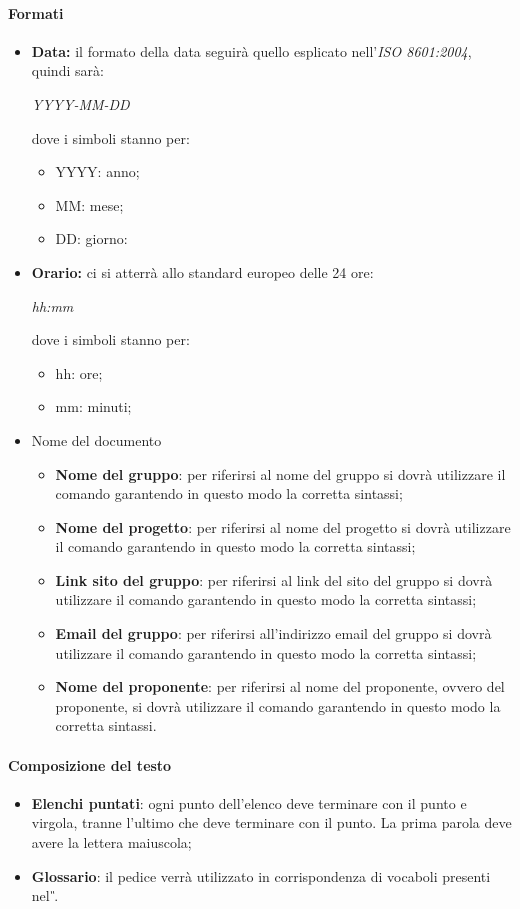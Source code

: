 \paragraph{Formati}
\begin{itemize}
	\item \textbf{Data:} il formato della data seguirà quello esplicato nell'\emph{ISO 8601:2004}, quindi sarà: 
	\begin{center}
		\emph{YYYY-MM-DD}
	\end{center}
	dove i simboli stanno per:
	\begin{itemize}
		\item YYYY: anno;
		\item MM: mese;
		\item DD: giorno:
	\end{itemize}
	\item \textbf{Orario:} ci si atterrà allo standard europeo delle 24 ore:
	 \begin{center}
	 	\emph{hh:mm}
	 \end{center}
 	dove i simboli stanno per:
 	\begin{itemize}
 		\item hh: ore;
 		\item mm: minuti;
 	\end{itemize}
	\item{Nome del documento}
	\begin{itemize}
	\item \textbf{Nome del gruppo}: per riferirsi al nome del gruppo si dovrà
	utilizzare il comando garantendo in questo modo la corretta sintassi;
	\item \textbf{Nome del progetto}: per riferirsi al nome del progetto si dovrà
	utilizzare il comando garantendo in questo modo la corretta sintassi;
	\item \textbf{Link sito del gruppo}: per riferirsi al link del sito del gruppo si dovrà
	utilizzare il comando garantendo in questo modo la corretta sintassi;
	\item \textbf{Email del gruppo}: per riferirsi all'indirizzo email del gruppo si dovrà
	utilizzare il comando garantendo in questo modo la corretta sintassi;
	\item \textbf{Nome del proponente}: per riferirsi al nome del proponente, ovvero del proponente, si dovrà
	utilizzare il comando garantendo in questo modo la corretta
	sintassi.
	\end{itemize}
\end{itemize}
\paragraph{Composizione del testo}
\begin{itemize}
	\item \textbf{Elenchi puntati}: ogni punto dell'elenco deve terminare con il punto e virgola,
	tranne l'ultimo che deve terminare con il punto. La prima parola deve avere la lettera
	maiuscola;
	\item \textbf{Glossario}: il pedice  verrà utilizzato in corrispondenza di vocaboli presenti nel \textit{\G}.
\end{itemize}
